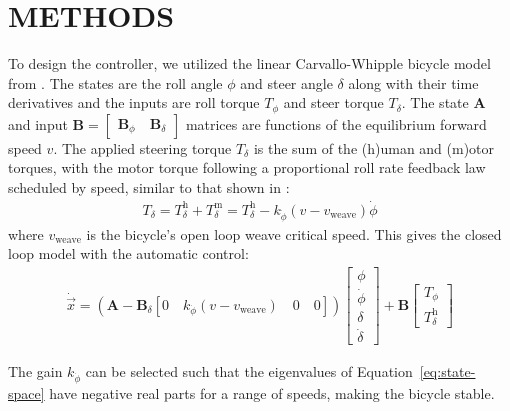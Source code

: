 \documentclass{icsc}
\begin{document}
\section{METHODS}
%
To design the controller, we utilized the linear Carvallo-Whipple bicycle model
from \cite{Meijaard2007}. The states are the roll angle \(\phi\) and steer
angle \(\delta\) along with their time derivatives and the inputs are roll
torque \(T_\phi\) and steer torque \(T_\delta\). The state \(\mathbf{A}\) and
input \(\mathbf{B} = \begin{bmatrix}\mathbf{B}_\phi \quad
\mathbf{B}_\delta\end{bmatrix} \) matrices are functions of the equilibrium
forward speed \(v\). The applied steering torque \(T_\delta\) is the sum of the
(h)uman and (m)otor torques, with the motor torque following a proportional
roll rate feedback law scheduled by speed, similar to that shown in
\cite{Schwab2008}:
%
\begin{align}
  T_\delta =
  T_\delta^\textrm{h} + T_\delta^\textrm{m} =
  T_\delta^\textrm{h} - k_{\dot{\phi}}(v - v_\textrm{weave})\dot{\phi}
\end{align}
where \(v_\textrm{weave}\) is the bicycle's open loop weave critical speed.
This gives the closed loop model with the automatic control:
%
\begin{align}
  \dot{\vec{x}} =
  \left(
    \mathbf{A} - \mathbf{B}_\delta
    \left[0 \quad k_{\dot{\phi}}(v - v_\textrm{weave}) \quad 0 \quad 0\right]
  \right)
  \begin{bmatrix} \phi \\ \dot{\phi} \\ \delta \\ \dot{\delta} \end{bmatrix} +
  \mathbf{B}
  \begin{bmatrix} T_{\phi} \\ T_\delta^\textrm{h} \end{bmatrix}
  \label{eq:state-space}
\end{align}

The gain \(k_{\dot{\phi}}\) can be selected such that the eigenvalues of
Equation~\ref{eq:state-space} have negative real parts for a range of speeds,
making the bicycle stable.
\end{document}
